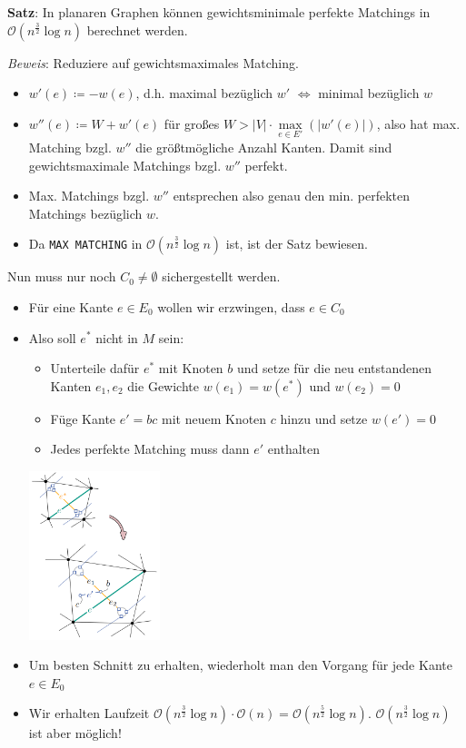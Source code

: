 \textbf{Satz}: In planaren Graphen können gewichtsminimale perfekte Matchings in $\mathcal{O}(n^\frac{3}{2}\log n)$ berechnet werden.

\textit{Beweis}: Reduziere auf gewichtsmaximales Matching.
\begin{itemize}
	\item $w'(e)\coloneqq -w(e)$, d.h. maximal bezüglich $w'$ $\iff$ minimal bezüglich $w$
	\item $w''(e)\coloneqq W+w'(e)$ für großes $W>|V|\cdot\max\limits_{e\in E'} (|w'(e)|)$, also hat max. Matching bzgl. $w''$ die größtmögliche Anzahl Kanten. Damit sind gewichtsmaximale Matchings bzgl. $w''$ perfekt.
	\item Max. Matchings bzgl. $w''$ entsprechen also genau den min. perfekten Matchings bezüglich $w$.
	\item Da \texttt{MAX MATCHING} in $\mathcal{O}(n^\frac{3}{2}\log n)$ ist, ist der Satz bewiesen.
\end{itemize}
\bigskip
Nun muss nur noch $C_0\neq\emptyset$ sichergestellt werden.
\begin{itemize}
	\item Für eine Kante $e\in E_0$ wollen wir erzwingen, dass $e\in C_0$
	\item Also soll $e^*$ nicht in $M$ sein:
	\begin{itemize}
		\item Unterteile dafür $e^*$ mit Knoten $b$ und setze für die neu entstandenen Kanten $e_1,e_2$ die Gewichte $w(e_1)=w(e^*)$ und $w(e_2)=0$
		\item Füge Kante $e'=bc$ mit neuem Knoten $c$ hinzu und setze $w(e')=0$
		\item Jedes perfekte Matching muss dann $e'$ enthalten
	\end{itemize}
	\begin{center}
		\includegraphics[width=0.3\textwidth]{images/mmc-8.png}
	\end{center}
	\item Um besten Schnitt zu erhalten, wiederholt man den Vorgang für jede Kante $e\in E_0$
	\item Wir erhalten Laufzeit $\mathcal{O}(n^\frac{3}{2}\log n)\cdot\mathcal{O}(n)=\mathcal{O}(n^\frac{5}{2}\log n)$. $\mathcal{O}(n^\frac{3}{2}\log n)$ ist aber möglich!
\end{itemize}

